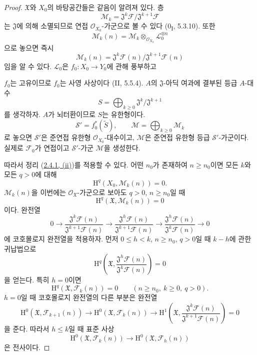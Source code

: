 \begin{proof}
$\mathfrak X$와 $X_0$의 바탕공간들은 같음이 알려져 있다. 층
\[
\mathcal M_k
=\mathfrak J^k\mathcal F/\mathfrak J^{k+1}\mathcal F
\]
는 $\mathfrak J$에 의해 소멸되므로 연접
$\mathcal O_{X_0}$-가군으로 볼 수 있다
(0\textsubscript{I}, 5.3.10). 또한
\[
\mathcal M_k(n)
=\mathcal M_k\otimes_{\mathcal O_{X_0}}\mathcal L_0^{\otimes n}
\]
으로 놓으면 즉시
\[
\mathcal M_k(n)
=\mathfrak J^k\mathcal F(n)/
\mathfrak J^{k+1}\mathcal F(n)
\]
임을 알 수 있다. $\mathcal L_0$은
$f_0:X_0\to Y_0$에 관해 풍부하고


$f_0$는 고유이므로 $f_0$는 사영 사상이다 (II, 5.5.4).
$A$의 $\mathfrak J$-아딕 여과에 결부된 등급 $A$-대수
\[
S=\bigoplus_{k\geq0}
\mathfrak J^k/\mathfrak J^{k+1}
\]
를 생각하자. $A$가 뇌터환이므로 $S$는 유한형이다.
\[
\mathcal S'=f_0^*(\widetilde S),\qquad
\mathcal M=\bigoplus_{k\geq0}\mathcal M_k
\]
로 놓으면 $\mathcal S'$은 준연접 유한형
$\mathcal O_{X_0}$-대수이고, $\mathcal M$은 준연접 유한형 등급
$\mathcal S'$-가군이다. 실제로 $\mathcal F_0$가 연접이고
$\mathcal S'$-가군 $\mathcal M$을 생성한다.

따라서 정리 (\hyperref[III.2.4.1-fr]{2.4.1, (ii)})를 적용할 수
있다. 어떤 $n_0$가 존재하여 $n\geq n_0$이면 모든 $k$와 모든
$q>0$에 대해
\begin{equation}
\mathrm H^q(X_0,\mathcal M_k(n))=0.
\tag{5.2.3.1}
\label{III.5.2.3.1-fr}
\end{equation}
$\mathcal M_k(n)$을 이번에는 $\mathcal O_{\mathfrak X}$-가군으로
보아도 $q>0$, $n\geq n_0$일 때
\[
\mathrm H^q(\mathfrak X,\mathcal M_k(n))=0
\]
이다. 완전열
\[
0\longrightarrow
\frac{\mathfrak J^k\mathcal F(n)}
{\mathfrak J^{k+1}\mathcal F(n)}
\longrightarrow
\frac{\mathfrak J^h\mathcal F(n)}
{\mathfrak J^{k+1}\mathcal F(n)}
\longrightarrow
\frac{\mathfrak J^h\mathcal F(n)}
{\mathfrak J^k\mathcal F(n)}
\longrightarrow0
\]
에 코호몰로지 완전열을 적용하자. 먼저 $0\leq h<k$,
$n\geq n_0$, $q>0$일 때 $k-h$에 관한 귀납법으로
\begin{equation}
\mathrm H^q\left(\mathfrak X,
\frac{\mathfrak J^h\mathcal F(n)}
{\mathfrak J^k\mathcal F(n)}\right)=0
\tag{5.2.3.2}
\label{III.5.2.3.2-fr}
\end{equation}
을 얻는다. 특히 $h=0$이면
\begin{equation}
\mathrm H^q(\mathfrak X,\mathcal F_k(n))=0
\qquad
(n\geq n_0,\ k\geq0,\ q>0).
\tag{5.2.3.3}
\label{III.5.2.3.3-fr}
\end{equation}
$h=0$일 때 코호몰로지 완전열의 다른 부분은 완전열
\begin{equation}
\mathrm H^0(\mathfrak X,\mathcal F_{k+1}(n))
\longrightarrow
\mathrm H^0(\mathfrak X,\mathcal F_k(n))
\longrightarrow
\mathrm H^1\left(\mathfrak X,
\frac{\mathfrak J^k\mathcal F(n)}
{\mathfrak J^{k+1}\mathcal F(n)}\right)=0
\tag{5.2.3.4}
\label{III.5.2.3.4-fr}
\end{equation}
을 준다. 따라서 $h\leq k$일 때 표준 사상
\begin{equation}
\mathrm H^0(\mathfrak X,\mathcal F_k(n))
\longrightarrow
\mathrm H^0(\mathfrak X,\mathcal F_h(n))
\tag{5.2.3.5}
\label{III.5.2.3.5-fr}
\end{equation}
은 전사이다.


\end{proof}
